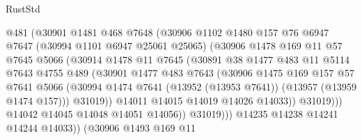 \begin{lexlean}{RustStd}
\begin{coremodule}
                        @481
                        (@30901
                          @1481
                          @468
                          @7648
                          (@30906
                            @1102
                            @1480
                            @157
                            @76
                            @6947
                            @7647
                            (@30994 @1101 @6947 @25061 @25065)
                            (@30906
                              @1478
                              @169
                              @11
                              @57
                              @7645
                              @5066
                              (@30914
                                @1478
                                @11
                                @7645
                                (@30891
                                  @38
                                  @1477
                                  @483
                                  @11
                                  @5114
                                  @7643
                                  @4755
                                  @489
                                  (@30901
                                    @1477
                                    @483
                                    @7643
                                    (@30906
                                      @1475
                                      @169
                                      @157
                                      @57
                                      @7641
                                      @5066
                                      (@30994
                                        @1474
                                        @7641
                                        (@13952 (@13953 @7641))
                                        (@13957 (@13959 @1474 @157)))
                                      @31019))
                                  @14011
                                  @14015
                                  @14019
                                  @14026
                                  @14033))
                              @31019)))
                        @14042
                        @14045
                        @14048
                        @14051
                        @14056))
                    @31019)))
              @14235
              @14238
              @14241
              @14244
              @14033))
          (@30906
            @1493
            @169
            @11

\end{coremodule}
\end{lexlean}
